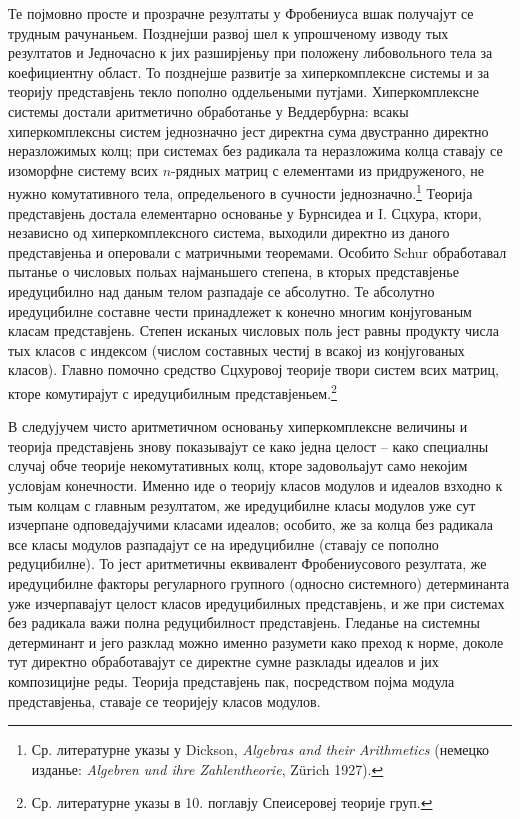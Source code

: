 ﻿\documentclass[11pt]{article}
\begin{document}
Те појмовно просте и прозрачне резултаты у Фробениуса вшак получајут се трудным рачунаньем. Позднејши развој шел к упрошченому изводу тых резултатов и Једночасно к јих разширјеньу при положену либовольного тела за коефициентну област. То позднејше развитје за хиперкомплексне системы и за теорију представјень текло пополно оддельеными путјами. Хиперкомплексне системы достали аритметично обработанье у Веддербурна: всакы хиперкомплексны систем једнозначно јест директна сума двустранно директно неразложимых колц; при системах без радикала та неразложима колца ставају се изоморфне систему всих $n$-рядных матриц с елементами из придруженого, не нужно комутативного тела, определьеного в сучности једнозначно.\footnote{Ср. литературне указы у Dickson, \emph{Algebras and their Arithmetics} (немецко изданье: \emph{Algebren und ihre Zahlentheorie}, Zürich 1927).} Теорија представјень достала елементарно основанье у Бурнсидеа и I. Сцхура, ктори, независно од хиперкомплексного система, выходили директно из даного представјеньа и оперовали с матричными теоремами. Особито Schur обработавал пытанье о числовых польах најманьшего степена, в кторых представјенье иредуцибилно над даным телом разпадаје се абсолутно. Те абсолутно иредуцибилне составне чести принадлежет к конечно многим конјугованым класам представјень. Степен исканых числовых поль јест равны продукту числа тых класов с индексом (числом составных честиј в всакој из конјугованых класов). Главно помочно средство Сцхуровој теорије твори систем всих матриц, кторе комутирајут с иредуцибилным представјеньем.\footnote{Ср. литературне указы в 10. поглавју Спеисеровеј теорије груп.}

В следујучем чисто аритметичном основаньу хиперкомплексне величины и теорија представјень знову показывајут се како једна целост -- како специалны случај обче теорије некомутативных колц, кторе задовольајут само некојим условјам конечности. Именно иде о теорију класов модулов и идеалов взходно к тым колцам с главным резултатом, же иредуцибилне класы модулов уже сут изчерпане одповедајучими класами идеалов; особито, же за колца без радикала все класы модулов разпадајут се на иредуцибилне (ставају се пополно редуцибилне). То јест аритметичны еквивалент Фробениусового резултата, же иредуцибилне факторы регуларного групного (односно системного) детерминанта уже изчерпавајут целост класов иредуцибилных представјень, и же при системах без радикала важи полна редуцибилност представјень. Гледанье на системны детерминант и јего разклад можно именно разумети како преход к норме, доколе тут директно обработавајут се директне сумне разклады идеалов и јих композицијне реды. Теорија представјень пак, посредством појма модула представјеньа, ставаје се теоријеју класов модулов.
\end{document}
